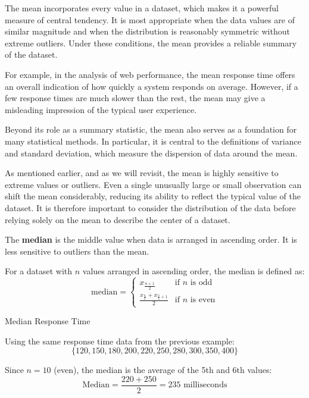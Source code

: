 The mean incorporates every value in a dataset, which makes it a powerful measure of central tendency. It is most appropriate when the data values are of similar magnitude and when the distribution is reasonably symmetric without extreme outliers. Under these conditions, the mean provides a reliable summary of the dataset.

For example, in the analysis of web performance, the mean response time offers an overall indication of how quickly a system responds on average. However, if a few response times are much slower than the rest, the mean may give a misleading impression of the typical user experience.

Beyond its role as a summary statistic, the mean also serves as a foundation for many statistical methods. In particular, it is central to the definitions of variance and standard deviation, which measure the dispersion of data around the mean.

\begin{remark}
    As mentioned earlier, and as we will revisit, the mean is highly sensitive to extreme values or outliers. Even a single unusually large or small observation can shift the mean considerably, reducing its ability to reflect the typical value of the dataset.
    It is therefore important to consider the distribution of the data before relying solely on the mean to describe the center of a dataset.
\end{remark}

The \textbf{median} is the middle value when data is arranged in ascending order. It is less sensitive to outliers than the mean.

\begin{definition}[Median]
    For a dataset with $n$ values arranged in ascending order, the median is defined as:
    \[
    \text{median} =
    \begin{cases}
        x_{\frac{n+1}{2}} & \text{if } n \text{ is odd} \\
        \frac{x_{\frac{n}{2}} + x_{\frac{n}{2}+1}}{2} & \text{if } n \text{ is even}
    \end{cases}
    \]
\end{definition}

\begin{example} Median Response Time

Using the same response time data from the previous example:
\[
\{120, 150, 180, 200, 220, 250, 280, 300, 350, 400\}
\]

Since $n = 10$ (even), the median is the average of the 5th and 6th values:
\[
\text{Median} = \frac{220 + 250}{2} = 235 \text{ milliseconds}
\]
\end{example}

